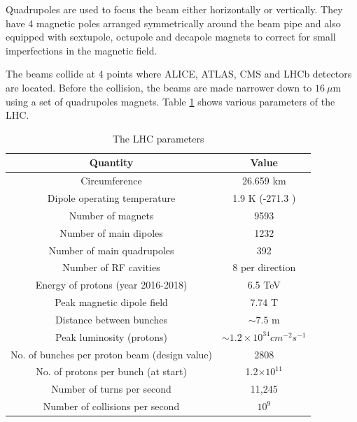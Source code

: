Quadrupoles are used to focus the beam either horizontally or vertically. They have 4 magnetic poles arranged symmetrically around the beam pipe and also equipped with sextupole, octupole and decapole magnets to correct for small imperfections in the magnetic field.

The beams collide at 4 points where ALICE, ATLAS, CMS and LHCb detectors are located. Before the collision, the beams are made narrower down to $16\ \mu$m using a set of quadrupoles magnets. Table \ref{tab:LHCparms} shows various parameters of the LHC.
\begin{table}[h!]
\centering
\caption[The LHC parameters]{The LHC parameters \cite{LHCfaq}}
\label{tab:LHCparms}
\begin{tabular}{|c|c|}
\hline  
Quantity			&	Value  \\ \hline
Circumference  &	26.659 km  \\ 
Dipole operating temperature	&	1.9 K (-271.3 \textcelsius) \\
Number of magnets	&	9593 \\
Number of main dipoles	&	1232 \\
Number of main quadrupoles	&	392 \\
Number of RF cavities	&	8 per direction \\
Energy of protons (year 2016-2018)	&	6.5 TeV\\
Peak magnetic dipole field &	7.74 T\\
Distance between bunches	&	$\sim 7.5$ m\\
Peak luminosity (protons)	&	$\sim 1.2\times 10^{34} cm^{-2}s^{-1}$\\
No. of bunches per proton beam (design value)	&	2808\\
No. of protons per bunch (at start)	&	1.2$\times10^{11}$\\
Number of turns per second &	11,245 \\
Number of collisions per second	&	$10^9$\\\hline 
\end{tabular} 
\end{table}

